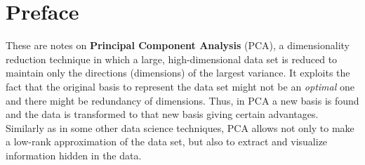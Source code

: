 \documentclass[10pt,twocolumn]{article}
\begin{document}



\vspace{10mm}

\setlength{\parindent}{0cm}

\fontsize{14}{10}\selectfont {Kamila Zdybał}

\vspace{2mm}

\fontsize{8}{10}

\fontsize{8}{10}

\section*{Preface}

These are notes on \textbf{Principal Component Analysis} (PCA), a dimensionality reduction technique in which a large, high-dimensional data set is reduced to maintain only the directions (dimensions) of the largest variance. It exploits the fact that the original basis to represent the data set might not be an \textit{optimal} one and there might be redundancy of dimensions. Thus, in PCA a new basis is found and the data is transformed to that new basis giving certain advantages. Similarly as in some other data science techniques, PCA allows not only to make a low-rank approximation of the data set, but also to extract and visualize information hidden in the data.
\end{document}
